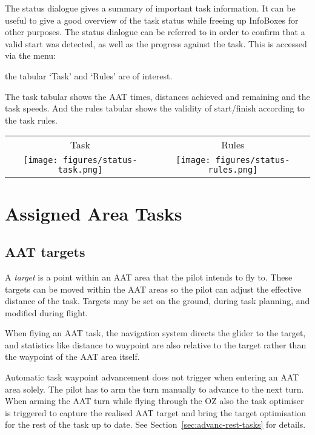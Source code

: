 The status dialogue gives a
summary of important task information.  It can be useful to give a
good overview of the task status while freeing up InfoBoxes for other
purposes.  The status dialogue can be referred to in order to confirm
that a valid start was detected, as well as the progress against the
task. This is accessed via the menu:
\begin{quote}
\blink{}
\end{quote}
the tabular `Task' and `Rules' are of interest.

The task tabular shows the AAT times, distances achieved and remaining and the 
task speeds. And the rules tabular shows the validity of start/finish according 
to the task rules.
\begin{center}
\begin{tabular}{c c}
Task & Rules \\
\texttt{[image: figures/status-task.png]} &
\texttt{[image: figures/status-rules.png]} \\
\end{tabular}
\end{center}

\section{Assigned Area Tasks}\label{sec:aat-tasks}

\subsection*{AAT targets}

A {\em target} is a point within an AAT area that the pilot intends to
fly to.  These targets can be moved within the AAT areas so the pilot
can adjust the effective distance of the task.  Targets may be set on
the ground, during task planning, and modified during flight.

When flying an AAT task, the navigation system directs the glider to
the target, and statistics like distance to waypoint are also relative
to the target rather than the waypoint of the AAT area itself.

Automatic task waypoint advancement does not trigger when entering an
AAT area solely. The pilot has to arm the turn manually to advance to the next
turn. When arming the AAT turn while flying through the OZ also the task
optimiser is triggered to capture the realised AAT target and bring the target
optimisation for the rest of the task up to date. See Section~\ref{sec:advanc-rest-tasks} 
for details.

